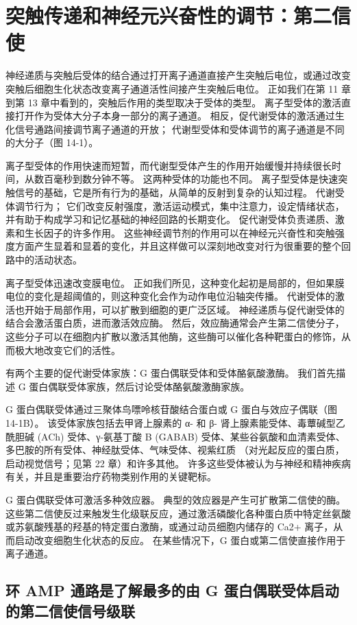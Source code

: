 \chapter{突触传递和神经元兴奋性的调节：第二信使} \label{chap:chap14}
神经递质与突触后受体的结合通过打开离子通道直接产生突触后电位，或通过改变突触后细胞生化状态改变离子通道活性间接产生突触后电位。 正如我们在第 11 章到第 13 章中看到的，突触后作用的类型取决于受体的类型。 离子型受体的激活直接打开作为受体大分子本身一部分的离子通道。 相反，促代谢受体的激活通过生化信号通路间接调节离子通道的开放； 代谢型受体和受体调节的离子通道是不同的大分子（图 14-1）。

离子型受体的作用快速而短暂，而代谢型受体产生的作用开始缓慢并持续很长时间，从数百毫秒到数分钟不等。 这两种受体的功能也不同。 离子型受体是快速突触信号的基础，它是所有行为的基础，从简单的反射到复杂的认知过程。 代谢受体调节行为； 它们改变反射强度，激活运动模式，集中注意力，设定情绪状态，并有助于构成学习和记忆基础的神经回路的长期变化。 促代谢受体负责递质、激素和生长因子的许多作用。 这些神经调节剂的作用可以在神经元兴奋性和突触强度方面产生显着和显着的变化，并且这样做可以深刻地改变对行为很重要的整个回路中的活动状态。

离子型受体迅速改变膜电位。 正如我们所见，这种变化起初是局部的，但如果膜电位的变化是超阈值的，则这种变化会作为动作电位沿轴突传播。 代谢受体的激活也开始于局部作用，可以扩散到细胞的更广泛区域。 神经递质与促代谢受体的结合会激活蛋白质，进而激活效应酶。 然后，效应酶通常会产生第二信使分子，这些分子可以在细胞内扩散以激活其他酶，这些酶可以催化各种靶蛋白的修饰，从而极大地改变它们的活性。

有两个主要的促代谢受体家族：G 蛋白偶联受体和受体酪氨酸激酶。 我们首先描述 G 蛋白偶联受体家族，然后讨论受体酪氨酸激酶家族。

G 蛋白偶联受体通过三聚体鸟嘌呤核苷酸结合蛋白或 G 蛋白与效应子偶联（图 14-1B）。 该受体家族包括去甲肾上腺素的 α- 和 β- 肾上腺素能受体、毒蕈碱型乙酰胆碱 (ACh) 受体、γ-氨基丁酸 B (GABAB) 受体、某些谷氨酸和血清素受体、多巴胺的所有受体、神经肽受体、气味受体、视紫红质 （对光起反应的蛋白质，启动视觉信号；见第 22 章）和许多其他。 许多这些受体被认为与神经和精神疾病有关，并且是重要治疗药物类别作用的关键靶标。

G 蛋白偶联受体可激活多种效应器。 典型的效应器是产生可扩散第二信使的酶。 这些第二信使反过来触发生化级联反应，通过激活磷酸化各种蛋白质中特定丝氨酸或苏氨酸残基的羟基的特定蛋白激酶，或通过动员细胞内储存的 Ca2+ 离子，从而启动改变细胞生化状态的反应。 在某些情况下，G 蛋白或第二信使直接作用于离子通道。

\section{环 AMP 通路是了解最多的由 G 蛋白偶联受体启动的第二信使信号级联}

